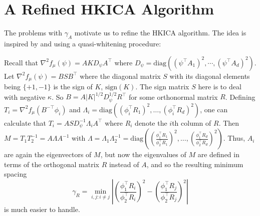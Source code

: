 \documentclass[twoside,11pt]{article}
\begin{document}
\section{A Refined HKICA Algorithm}
\label{sec:DICA}

The problems with $\gamma_A$ motivate us to refine the HKICA algorithm.
The idea is inspired by \citet{arora2012provable} and \citet{frieze1996learning} using a quasi-whitening procedure:

Recall that  $\nabla^2 f_{\mu}(\psi)=A K D_{\psi} A^\top$ where $D_{\psi}=\text{diag}\left((\psi^{\top}A_1)^2,\cdots, (\psi^{\top}A_d)^2\right)$.
 Let $\nabla^2 f_\mu(\psi) = BSB^{\top}$ where the diagonal matrix $S$ with its diagonal elements being $\{+1, -1\}$ is the sign of $K$, $\text{sign}(K)$. The sign matrix $S$ here is to deal with negative $\kappa$.
So $B=A|K|^{1/2}D_{\psi}^{1/2}R^{\top}$ for some orthonormal matrix $R$. Defining $T_i=\nabla^2 f_\mu(B^{-\top} \phi_i)$ and $\Lambda_i=\text{diag}\left((\phi_i^\top R_1)^2,\ldots,(\phi_i^\top R_d)^2 \right) $, one can calculate that
$T_i=A S D_\psi^{-1} \Lambda_i A^\top$ 
where $R_i$ denote the $i$th column of $R$.
Then $M=T_1 T_2^{-1} = A\Lambda A^{-1}$ with $\Lambda=\Lambda_1 \Lambda_2^{-1}=\text{diag}\left(\left(\frac{\phi_1^\top R_1}{\phi_2^\top R_1}\right)^2,\ldots,\left(\frac{\phi_1^\top R_d}{\phi_2^\top R_d}\right)^2\right)$. Thus, $A_i$ are again the eigenvectors of $M$, but now the eigenvalues of $M$ are defined in terms of the orthogonal matrix $R$ instead of $A$,
and so the resulting minimum spacing
\begin{equation}
\label{def:gammaR}
\gamma_R =  \min_{i,j: i\neq j} \left\vert \left(\frac{\phi_1^{\top}R_i}{\phi_2^{\top}R_i}\right)^2 - \left(\frac{\phi_1^{\top}R_j}{\phi_2^{\top}R_j}\right)^2 \right\vert
\end{equation}
is much easier to handle.
\end{document}
